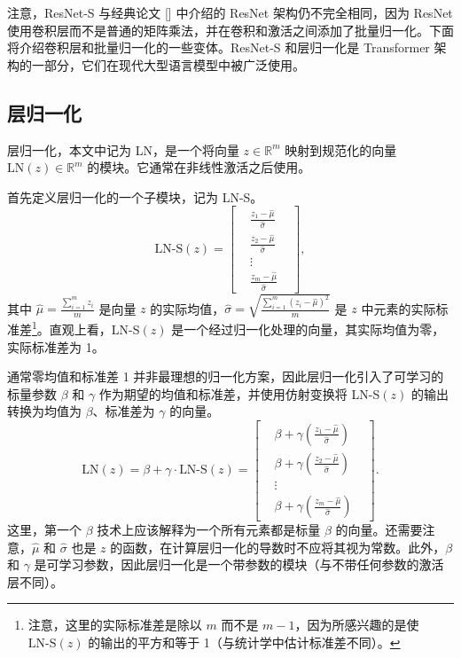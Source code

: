 注意，ResNet-S 与经典论文 [\cite{he2016resnet}] 中介绍的 ResNet 架构仍不完全相同，因为 ResNet 使用卷积层而不是普通的矩阵乘法，并在卷积和激活之间添加了批量归一化。下面将介绍卷积层和批量归一化的一些变体。ResNet-S 和层归一化是 Transformer 架构的一部分，它们在现代大型语言模型中被广泛使用。

\subsection*{层归一化}

层归一化，本文中记为 LN，是一个将向量 $z \in \mathbb{R}^m$ 映射到规范化的向量 $\text{LN}(z) \in \mathbb{R}^m$ 的模块。它通常在非线性激活之后使用。

首先定义层归一化的一个子模块，记为 LN-S。
\begin{equation}
    \text{LN-S}(z) = \begin{bmatrix}
        &\frac{z_1 - \hat{\mu}}{\hat{\sigma}}& \\
        &\frac{z_2 - \hat{\mu}}{\hat{\sigma}}& \\
        &\vdots& \\
        &\frac{z_m - \hat{\mu}}{\hat{\sigma}}&
    \end{bmatrix}, \label{eq:7.40}
\end{equation}
其中 $\hat{\mu} = \frac{\sum_{i=1}^m z_i}{m}$ 是向量 $z$ 的实际均值，$\hat{\sigma} = \sqrt{\frac{\sum_{i=1}^m (z_i - \hat{\mu})^2}{m}}$ 是 $z$ 中元素的实际标准差\footnote{注意，这里的实际标准差是除以 $m$ 而不是 $m-1$，因为所感兴趣的是使 $\text{LN-S}(z)$ 的输出的平方和等于 1（与统计学中估计标准差不同）。}。直观上看，LN-S$(z)$ 是一个经过归一化处理的向量，其实际均值为零，实际标准差为 1。

通常零均值和标准差 1 并非最理想的归一化方案，因此层归一化引入了可学习的标量参数 $\beta$ 和 $\gamma$ 作为期望的均值和标准差，并使用仿射变换将 LN-S$(z)$ 的输出转换为均值为 $\beta$、标准差为 $\gamma$ 的向量。
\begin{equation}
    \text{LN}(z) = \beta + \gamma \cdot \text{LN-S}(z) = \begin{bmatrix}
        &\beta + \gamma \left(\frac{z_1 - \hat{\mu}}{\hat{\sigma}}\right)& \\
        &\beta + \gamma \left(\frac{z_2 - \hat{\mu}}{\hat{\sigma}}\right)& \\
        &\vdots& \\
        &\beta + \gamma \left(\frac{z_m - \hat{\mu}}{\hat{\sigma}}\right)&
    \end{bmatrix}. \label{eq:7.41}
\end{equation}
这里，第一个 $\beta$ 技术上应该解释为一个所有元素都是标量 $\beta$ 的向量。还需要注意，$\hat{\mu}$ 和 $\hat{\sigma}$ 也是 $z$ 的函数，在计算层归一化的导数时不应将其视为常数。此外，$\beta$ 和 $\gamma$ 是可学习参数，因此层归一化是一个带参数的模块（与不带任何参数的激活层不同）。

